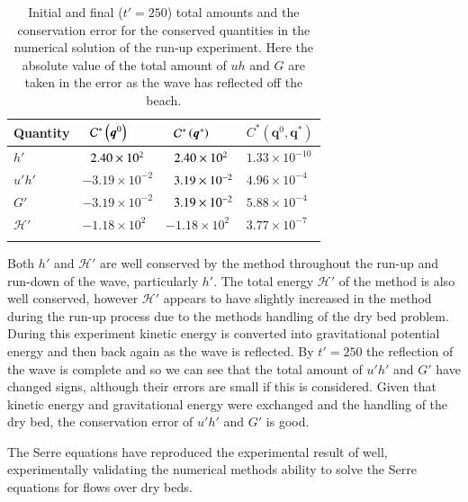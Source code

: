 \documentclass[times]{elsarticle}
\newcommand\T{\rule{0pt}{5ex }}       %
\newcommand\B{\rule[-4ex]{0pt}{4ex }} %
\newcommand{\vecn}[1]{\boldsymbol{#1}}
\begin{document}
\begin{table}
	\centering
	\begin{tabular}{l l l l}
		\hline
		Quantity& $\hphantom{-}\mathcal{C}^*\left(\vecn{q}^0\right)$ & $\hphantom{-}\mathcal{C}^*\left(\vecn{q}^*\right)$ & ${C}^*\left(\vecn{q}^0,\vecn{q}^*\right)$  \T\B\\
		\hline 
		$h'$ & $\hphantom{-}2.40\times 10^2$ & $\hphantom{-}2.40 \times 10^2$ & $1.33\times 10^{-10}$ \T \\
		$u'h'$ & $-3.19 \times 10 ^{-2}$ & $\hphantom{-}3.19 \times 10 ^{-2}$ & $4.96\times 10^{-4}$\\
		$G'$ & $-3.19 \times 10 ^{-2}$ & $\hphantom{-}3.19 \times 10 ^{-2}$ & $5.88\times 10^{-4}$\\
		$\mathcal{H}'$ & $-1.18 \times 10^{2}$ & $-1.18 \times 10^{2}$ & $3.77 \times 10^{-7}$ \B\\
		\hline \\
	\end{tabular}
	\caption{Initial and final ($t'=250$) total amounts and the conservation error for the conserved quantities in the numerical solution of the run-up experiment. Here the absolute value of the total amount of $uh$ and $G$ are taken in the error as the wave has reflected off the beach.}
	\label{tab:ConservationSynFEVM}
\end{table}

Both $h'$ and $\mathcal{H}'$ are well conserved by the method throughout the run-up and run-down of the wave, particularly $h'$. The total energy $\mathcal{H}'$ of the method is also well conserved, however $\mathcal{H}'$ appears to have slightly increased in the method during the run-up process due to the methods handling of the dry bed problem. During this experiment kinetic energy is converted into gravitational potential energy and then back again as the wave is reflected. By $t' = 250$ the reflection of the wave is complete and so we can see that the total amount of $u'h'$ and $G'$ have changed signs, although their errors are small if this is considered. Given that kinetic energy and gravitational energy were exchanged and the handling of the dry bed, the conservation error of $u'h'$ and $G'$ is good. 

The Serre equations have reproduced the experimental result of \citet{Synolakis-1987-523} well, experimentally validating the numerical methods ability to solve the Serre equations for flows over dry beds.
\end{document}
